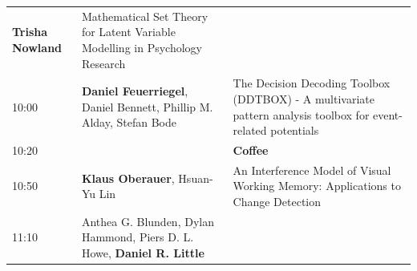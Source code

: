 \documentclass[]{article}
\begin{document}
\begin{longtable}[]{@{}lll@{}}
\begin{minipage}[t]{0.35\columnwidth}
\textbf{Trisha Nowland}\strut
\end{minipage} & \begin{minipage}[t]{0.53\columnwidth}\raggedright\strut
Mathematical Set Theory for Latent Variable Modelling in Psychology
Research\strut
\end{minipage}\tabularnewline
\begin{minipage}[t]{0.03\columnwidth}\raggedright\strut
10:00\strut
\end{minipage} & \begin{minipage}[t]{0.35\columnwidth}\raggedright\strut
\textbf{Daniel Feuerriegel}, Daniel Bennett, Phillip M. Alday, Stefan
Bode\strut
\end{minipage} & \begin{minipage}[t]{0.53\columnwidth}\raggedright\strut
The Decision Decoding Toolbox (DDTBOX) - A multivariate pattern analysis
toolbox for event-related potentials\strut
\end{minipage}\tabularnewline
\begin{minipage}[t]{0.03\columnwidth}\raggedright\strut
10:20\strut
\end{minipage} & \begin{minipage}[t]{0.35\columnwidth}\raggedright\strut
\strut
\end{minipage} & \begin{minipage}[t]{0.53\columnwidth}\raggedright\strut
\textbf{Coffee}\strut
\end{minipage}\tabularnewline
\begin{minipage}[t]{0.03\columnwidth}\raggedright\strut
10:50\strut
\end{minipage} & \begin{minipage}[t]{0.35\columnwidth}\raggedright\strut
\textbf{Klaus Oberauer}, Hsuan-Yu Lin\strut
\end{minipage} & \begin{minipage}[t]{0.53\columnwidth}\raggedright\strut
An Interference Model of Visual Working Memory: Applications to Change
Detection\strut
\end{minipage}\tabularnewline
\begin{minipage}[t]{0.03\columnwidth}\raggedright\strut
11:10\strut
\end{minipage} & \begin{minipage}[t]{0.35\columnwidth}\raggedright\strut
Anthea G. Blunden, Dylan Hammond, Piers D. L. Howe, \textbf{Daniel R.
Little}\strut
\end{minipage} & \begin{minipage}[t]{0.53\columnwidth}\raggedright\strut

\end{minipage}
\end{longtable}
\end{document}

